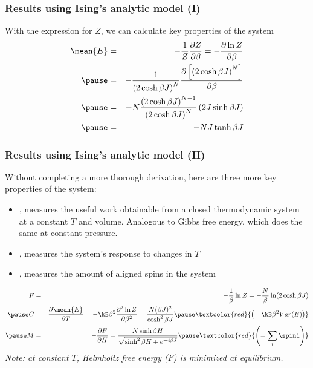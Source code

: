 \documentclass[hyperref={colorlinks=true}]{beamer}
\begin{document}

\begin{frame}%
  \frametitle{Results using Ising's analytic model (I)}

    With the expression for $Z$, we can calculate key properties of the system
%
  \begin{eqnarray}
    \mean{E} &=& -\frac{1}{Z}\frac{\partial Z}{\partial\beta} = -\frac{\partial \ln Z}{\partial\beta} \\ \pause
             &=& -\frac{1}{\left(2 \cosh \beta J\right)^{N}}\frac{\partial \left[\left(2 \cosh \beta J\right)^{N}\right]}{\partial\beta} \\ \pause
             &=& -N\frac{\left(2 \cosh \beta J\right)^{N-1}}{\left(2 \cosh \beta J\right)^{N}}\left(2J \sinh \beta J\right) \\ \pause
             &=& -NJ\tanh \beta J 
  \end{eqnarray}
  
\end{frame}


\begin{frame}%
  \frametitle{Results using Ising's analytic model (II)}

    Without completing a more thorough derivation, here are three more key properties of the system:
    \begin{itemize}
      \item<1-> , measures the useful work obtainable from a closed thermodynamic system at a constant $T$ and volume. Analogous to Gibbs free energy, which does the same at constant pressure.
      \item<2-> , measures the system's response to changes in $T$
      \item<4-> , measures the amount of aligned spins in the system
    \end{itemize}
%
  \begin{eqnarray}
           F &=& -\frac{1}{\beta} \ln Z = -\frac{N}{\beta} \ln (2 \cosh \beta J) \\ \pause   
           C &=& \frac{\partial \mean{E}}{\partial T} = -\kB \beta^2 \frac{\partial^2 \ln Z}{\partial \beta^2} = \frac{N (\beta J)^2}{\cosh^2 \beta J} \pause \textcolor{red}{\left(= \kB \beta^2 Var(E) \right)} \label{eq:specificheat} \\  \pause 
           M &=& -\frac{\partial F}{\partial H} = \frac{N \sinh \beta H}{\sqrt{\sinh^2 \beta H + e^{-4 \beta J}}}  \pause \textcolor{red}{\left(= \sum_i \spini \right)}  \label{eq:magnetization}
  \end{eqnarray} 
  \pause
  \textit{Note: at constant $T$, Helmholtz free energy ($F$) is minimized at equilibrium.}
  
\end{frame}
\end{document}
